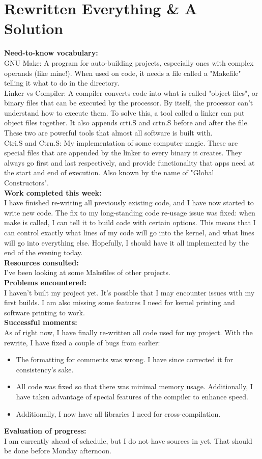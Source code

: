 \documentclass[11pt]{article}
\begin{document}
\section{Rewritten Everything \& A Solution}
\textbf{Need-to-know vocabulary:}\\
GNU Make: A program for auto-building projects, especially ones with complex operands (like mine!). When used on code, it needs a file called a "Makefile" telling it what to do in the directory.\\
Linker vs Compiler: A compiler converts code into what is called "object files", or binary files that can be executed by the processor. By itself, the processor can't understand how to execute them. To solve this, a tool called a linker can put object files together. It also appends crti.S and crtn.S before and after the file. These two are powerful tools that almost all software is built with.\\
Ctri.S and Ctrn.S: My implementation of some computer magic. These are special files that are appended by the linker to every binary it creates. They always go first and last respectively, and provide functionality that apps need at the start and end of execution. Also known by the name of "Global Constructors".\\
\textbf{Work completed this week:}\\
I have finished re-writing all previously existing code, and I have now started to write new code. The fix to my long-standing code re-usage issue was fixed: when make is called, I can tell it to build code with certain options. This means that I can control exactly what lines of my code will go into the kernel, and what lines will go into everything else. Hopefully, I should have it all implemented by the end of the evening today.\\
\textbf{Resources consulted:}\\
I've been looking at some Makefiles of other projects.\\
\textbf{Problems encountered:}\\
I haven't built my project yet. It's possible that I may encounter issues with my first builds. I am also missing some features I need for kernel printing and software printing to work.\\
\textbf{Successful moments:}\\
As of right now, I have finally re-written all code used for my project. With the rewrite, I have fixed a couple of bugs from earlier:
\begin{itemize}
\item The formatting for comments was wrong. I have since corrected it for consistency's sake.
\item All code was fixed so that there was minimal memory usage. Additionally, I have taken advantage of special features of the compiler to enhance speed. 
\item Additionally, I now have all libraries I need for cross-compilation.
\end{itemize}
\textbf{Evaluation of progress:}\\
I am currently ahead of schedule, but I do not have sources in yet. That should be done before Monday afternoon.
\end{document}
